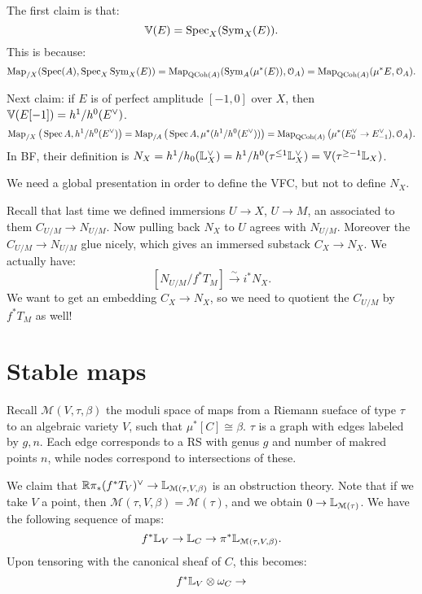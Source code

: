 The first claim is that:
\[	\mathbb V(E) = \operatorname{Spec}_X(\operatorname{Sym}_X(E)) .	\]
This is because:
\[	\operatorname{Map}_{/X}(\operatorname{Spec}(A), \operatorname{Spec}_X \operatorname{Sym}_X(E)) = \operatorname{Map}_{\mathrm{QCoh}(A)}(\operatorname{Sym}_A(\mu^*(E)), \mathcal{O}_A)	= \operatorname{Map}_{\mathrm{QCoh}(A)} (\mu^*E,\mathcal{O}_A).\]

Next claim: if $E$ is of perfect amplitude $[-1,0]$ over $X$, then $\mathbb V(E[-1]) = h^1/h^0(E^{\vee})$.
\[	\operatorname{Map}_{/X}\big(\operatorname{Spec} A, h^1/h^0(E^{\vee})\big) = \operatorname{Map}_{/A}\big(\operatorname{Spec} A, \mu^*(h^1/h^0(E^{\vee}))\big)
= \operatorname{Map}_{\mathrm{QCoh}(A)}\big(\mu^*(E_0^{\vee}\to E_{-1}^{\vee}) , \mathcal{O}_A\big).	\]
In BF, their definition is $N_X = h^1/h_0(\mathbb L_X^{\vee}) = h^1/h^0(\tau^{\leq 1}\mathbb L_X^{\vee}) = \mathbb V(\tau^{\geq -1} \mathbb L_X)$.

\begin{rem}
We need a global presentation in order to define the VFC, but not to define $N_X$.
\end{rem}

Recall that last time we defined immersions $U\to X$, $ U \to M$, an associated to them $C_{U/M} \to N_{U/M}$. Now pulling back
$N_X$ to $U$ agrees with $N_{U/M}$. Moreover the $C_{U/M} \to N_{U/M}$ glue nicely, which gives an immersed substack
$C_X \to N_X$.  We actually have:
\[	[N_{U/M} / f^* T_M] \overset{\sim}{\to} i^*N_X.	\]
We want to get an embedding $C_X \to N_X$, so we need to quotient the $C_{U/M}$ by $f^*T_M$ as well!


\section{Stable maps}
Recall $\mathcal{M}(V,\tau,\beta)$ the moduli space of maps from a Riemann sueface of type $\tau$ to an algebraic variety $V$,
such that $\mu^*[C] \cong \beta$. $\tau$ is a graph with edges labeled by $g,n$. Each edge corresponds to a RS with genus $g$ 
and number of makred points $n$, while nodes correspond to intersections of these.


We claim that $\mathbb R\pi_*(f^*T_V)^{\vee} \to \mathbb L_{\mathcal{M}(\tau,V,\beta)}$ is an obstruction theory. Note that if we take
$V$ a point, then $\mathcal{M}(\tau,V,\beta) = \mathcal{M}(\tau)$, and we obtain $0 \to \mathbb L_{\mathcal{M}(\tau)}$.
We have the following sequence of maps:
\[	f^*\mathbb L_V \to \mathbb L_C \to \pi^* \mathbb L_{\mathcal{M}(\tau,V,\beta)}.	\]
Upon tensoring with the canonical sheaf of $C$, this becomes:
\[	f^*\mathbb L_V \otimes \omega_C \to	\]

